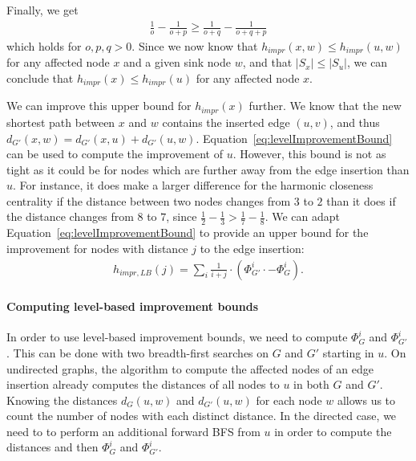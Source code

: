Finally, we get
 \begin{align}
	\frac{1}{o} - \frac{1}{o + p} \geq \frac{1}{o + q} - \frac{1}{o + q + p}
\end{align}
which holds for $o, p, q > 0$. Since we now know that $h_{impr}(x, w) \leq h_{impr}(u, w)$ for any affected node $x$ and a given sink node $w$, and that $|S_x| \leq |S_u|$, we can conclude that $h_{impr}(x) \leq h_{impr}(u)$ for any affected node $x$. 

We can improve this upper bound for $h_{impr}(x)$ further. We know that the new shortest path between $x$ and $w$ contains the inserted edge $(u, v)$, and thus $d_{G'}(x, w) = d_{G'}(x, u) + d_{G'}(u, w)$. Equation~\ref{eq:levelImprovementBound} can be used to compute the improvement of $u$. However, this bound is not as tight as it could be for nodes which are further away from the edge insertion than $u$. For instance, it does make a larger difference for the harmonic closeness centrality if the distance between two nodes changes from $3$ to $2$ than it does if the distance changes from $8$ to $7$, since $\frac{1}{2} - \frac{1}{3} > \frac{1}{7} - \frac{1}{8}$. We can adapt Equation~\ref{eq:levelImprovementBound} to provide an upper bound for the improvement for nodes with distance $j$ to the edge insertion:
\begin{align}
	h_{impr,LB}(j) = \sum_{i}{\frac{1}{i + j} \cdot \left(\Phi_{G'}^i \cdot - \Phi_G^i\right)}.
\end{align}


\paragraph{Computing level-based improvement bounds}
In order to use level-based improvement bounds, we need to compute $\Phi_G^i$ and $\Phi_{G'}^i$. This can be done with two breadth-first searches on $G$ and $G'$ starting in $u$. On undirected graphs, the algorithm to compute the affected nodes of an edge insertion already computes the distances of all nodes to $u$ in both $G$ and $G'$. Knowing the distances $d_G(u, w)$ and $d_{G'}(u, w)$ for each node $w$ allows us to count the number of nodes with each distinct distance. In the directed case, we need to to perform an additional forward BFS from $u$ in order to compute the distances and then $\Phi_G^i$ and $\Phi_{G'}^i$.


